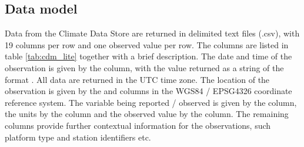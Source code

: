 \FloatBarrier
\subsection{Data model}
\label{subsection:data_model}
Data from the Climate Data Store are returned in delimited text files (.csv), with 19 columns per row and one observed value per row. 
The columns are listed in table \ref{tab:cdm_lite} together with a brief description.  
The date and time of the observation is given by the  column, with the value returned as a string of the format . 
All data are returned in the UTC time zone.
The location of the observation is given by the  and  columns in the WGS84 / EPSG4326 coordinate reference system. 
The variable being reported / observed is given by the  column, the units by the  column and the observed value by the  column. 
The remaining columns provide further contextual information for the observations, such platform type and station identifiers etc. 


